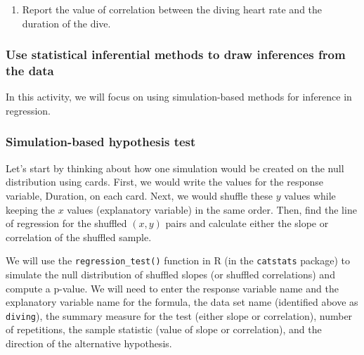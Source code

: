 \documentclass[
]{report}
\providecommand{\tightlist}{%
  \setlength{\itemsep}{0pt}\setlength{\parskip}{0pt}}
\begin{document}
\vspace{1in}

\begin{enumerate}
\def\labelenumi{\arabic{enumi}.}
\setcounter{enumi}{7}
\tightlist
\item
  Report the value of correlation between the diving heart rate and the duration of the dive.
\end{enumerate}

\vspace{0.3in}

\hypertarget{use-statistical-inferential-methods-to-draw-inferences-from-the-data-5}{%
\subsubsection*{Use statistical inferential methods to draw inferences from the data}\label{use-statistical-inferential-methods-to-draw-inferences-from-the-data-5}}

In this activity, we will focus on using simulation-based methods for inference in regression.

\hypertarget{simulation-based-hypothesis-test}{%
\subsubsection*{Simulation-based hypothesis test}\label{simulation-based-hypothesis-test}}

Let's start by thinking about how one simulation would be created on the null distribution using cards. First, we would write the values for the response variable, Duration, on each card. Next, we would shuffle these \(y\) values while keeping the \(x\) values (explanatory variable) in the same order. Then, find the line of regression for the shuffled \((x, y)\) pairs and calculate either the slope or correlation of the shuffled sample.

We will use the \texttt{regression\_test()} function in R (in the \texttt{catstats} package) to simulate the null distribution of shuffled slopes (or shuffled correlations) and compute a p-value. We will need to enter the response variable name and the explanatory variable name for the formula, the data set name (identified above as \texttt{diving}), the summary measure for the test (either slope or correlation), number of repetitions, the sample statistic (value of slope or correlation), and the direction of the alternative hypothesis.
\end{document}
